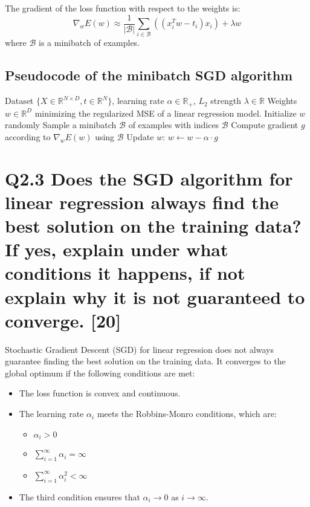\documentclass[11pt]{article}
\begin{document}
The gradient of the loss function with respect to the weights is:
\[
\nabla_w E(w) \approx \frac{1}{|\mathcal{B}|} \sum_{i \in \mathcal{B}} ((x_i^T w - t_i)x_i) + \lambda w
\]
where \( \mathcal{B} \) is a minibatch of examples.

\begin{algorithm}
\subsection*{Pseudocode of the minibatch SGD algorithm}
\begin{algorithmic}[1]
\Require Dataset \( \{X \in \mathbb{R}^{N \times D}, t \in \mathbb{R}^N\} \), learning rate \( \alpha \in \mathbb{R}_+ \), \( L_2 \) strength \( \lambda \in \mathbb{R} \)
\Ensure Weights \( w \in \mathbb{R}^D \) minimizing the regularized MSE of a linear regression model.
\State Initialize \( w \) randomly
\Repeat
    \State Sample a minibatch \( \mathcal{B} \) of examples with indices \( \mathcal{B} \)
    \State Compute gradient \( g \) according to \( \nabla_w E(w) \) using \( \mathcal{B} \)
    \State Update \( w \): \( w \leftarrow w - \alpha \cdot g \)
\end{algorithmic}
\end{algorithm}


\section{Q2.3 Does the SGD algorithm for linear regression always find the best solution on the training data? If yes, explain under what conditions it happens, if not explain why it is not guaranteed to converge. [20]}

Stochastic Gradient Descent (SGD) for linear regression does not always guarantee finding the best solution on the training data. It converges to the global optimum if the following conditions are met:

\begin{itemize}
    \item The loss function is convex and continuous.
    \item The learning rate \( \alpha_i \) meets the Robbins-Monro conditions, which are:
    \begin{itemize}
        \item \( \alpha_i > 0 \)
        \item \( \sum_{i=1}^{\infty} \alpha_i = \infty \)
        \item \( \sum_{i=1}^{\infty} \alpha_i^2 < \infty \)
    \end{itemize}
    \item The third condition ensures that \( \alpha_i \rightarrow 0 \) as \( i \rightarrow \infty \).
\end{itemize}
\end{document}
